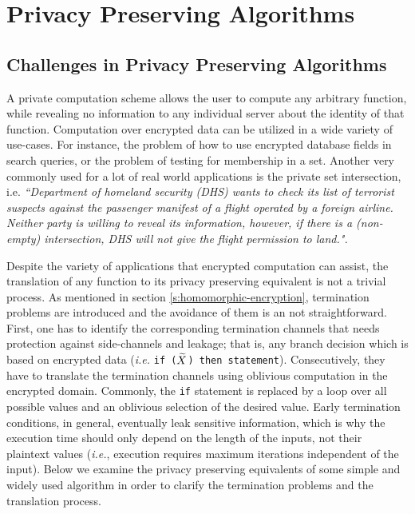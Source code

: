 \chapter{Privacy Preserving Algorithms}\label{c:pp-algorithms}

\section{Challenges in Privacy Preserving Algorithms}\label{s:challenges}
A private computation scheme allows the user to compute any arbitrary function, while revealing no information to any individual server about the identity of that function.
Computation over encrypted data can be utilized in a wide variety of use-cases.
For instance, the problem of how to use encrypted database fields in search queries, or the problem of testing for membership in a set.
Another very commonly used for a lot of real world applications is the private set intersection, i.e. \textit{``Department of homeland security (DHS) wants to check its list of terrorist suspects against the passenger manifest of a flight operated by a foreign airline.
Neither party is willing to reveal its information, however, if there is a (non-empty) intersection, DHS will not give the flight permission to land.".}


Despite the variety of applications that encrypted computation can assist, the translation of any function to its privacy preserving equivalent is not a trivial process.
As mentioned in section \ref{s:homomorphic-encryption}, termination problems are introduced and the avoidance of them is an not straightforward.
First, one has to identify the corresponding termination channels that needs protection against side-channels and leakage; that is, any branch decision which is based on encrypted data (\textit{i.e.} \texttt{if ($\widetilde{X}$) then statement}).
Consecutively, they have to translate the termination channels using oblivious computation in the encrypted domain.
Commonly, the \texttt{if} statement is replaced by a loop over all possible values and an oblivious selection of the desired value.
Early termination conditions, in general, eventually leak sensitive information, which is why the execution time should only depend on the length of the inputs, not their plaintext values (\textit{i.e.}, execution requires maximum iterations independent of the input).
Below we examine the privacy preserving equivalents of some simple and widely used algorithm in order to clarify the termination problems and the translation process.


